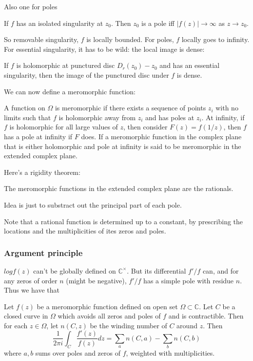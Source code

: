 \documentclass[main.tex]{subfiles}
\begin{document}
Also one for poles
\begin{corollary}
If $f$ has an isolated singularity at $z_0$. Then $z_0$ is a pole iff $|f(z)| \rightarrow \infty$ as $z \rightarrow z_0$.
\end{corollary}

So removable singularity, $f$ is locally bounded. For poles, $f$ locally goes to infinity. For essential singularity, it has to be wild: the local image is dense:

\begin{theorem}
If $f$ is holomorphic at punctured disc 
$D_r(z_0) - z_0$ and has an essential singularity, then the image of the punctured disc under $f$ is dense.
\end{theorem}

We can now define a meromorphic function:
\begin{definition}
A function on $\Omega$ is meromorphic if there exists a sequence of points $z_i$ with no limits such that $f$ is holomorphic away from $z_i$ and has poles at $z_i$. At infinity, if $f$ is holomorphic for all large values of $z$, then consider $F(z) = f(1/z)$, then $f$ has a pole at infinity if $F$ does. If a meromorphic function in the complex plane that is either holomorphic and pole at infinity is said to be meromorphic in the extended complex plane.
\end{definition}

Here's a rigidity theorem:
\begin{theorem}
The meromorphic functions in the extended complex plane are the rationals. 
\end{theorem}
Idea is just to substract out the principal part of each pole.

Note that a rational function is determined up to a constant, by prescribing the locations and the multiplicities of ites zeros and poles.

\subsubsection{Argument principle}
$log f(z)$ can't be globally defined on $\mathbb{C}^\times$. But its differential $f'/f$ can, and for any zeros of order $n$ (might be negative), $f'/f$ has a simple pole with residue $n$. Thus we have that

\begin{theorem}
Let $f(z)$ be a meromorphic function defined on open set $\Omega \subset \mathbb{C}$. Let $C$ be a closed curve in $\Omega$ which avoids all zeros and poles of $f$ and is contractible. Then for each $z \in \Omega$, let $n(C,z)$ be the winding number of $C$ around $z$. Then 
$$
\frac{1}{2\pi i} \int_C \frac{f'(z)}{f(z)} dz = \sum_a n(C,a) - \sum_b n(C,b)
$$
where $a, b$ sums over poles and zeros of $f$, weighted with multiplicities.
\end{theorem}
\end{document}
